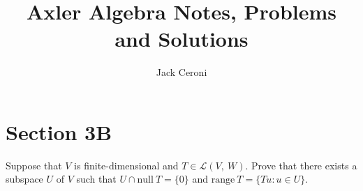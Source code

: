 \documentclass[10pt, oneside]{article}
\title{Axler Algebra Notes, Problems and Solutions}
\author{Jack Ceroni}
\date{}
\newenvironment{problem}[2][Problem]{\begin{trivlist}
\item[\hskip \labelsep {\bfseries #1}\hskip \labelsep {\bfseries #2.}]}{\end{trivlist}}
\begin{document}
    \maketitle
    \tableofcontents

    \vspace{.25in}

    \newpage

    \section{Section 3B}

    \begin{problem}{3.12}

      Suppose that $V$ is finite-dimensional and $T \in \mathcal{L}(V, \ W)$. Prove that there exists a subspace
      $U$ of $V$ such that $U \cap \text{null} \ T = \{0\}$ and $\text{range} \ T = \{Tu : u \in U\}$.

      \end{problem}
\end{document}
